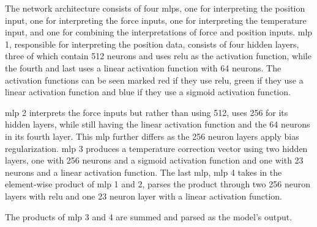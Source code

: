 The network architecture consists of four \gls{mlp}s, one for interpreting the position input, one for interpreting the force inputs, one for interpreting the temperature input, and one for combining the interpretations of force and position inputs. \gls{mlp} \num{1}, responsible for interpreting the position data, consists of four hidden layers, three of which contain \num{512} neurons and uses \gls{relu} as the activation function, while the fourth and last uses a linear activation function with \num{64} neurons. The activation functions can be seen marked red if they use \gls{relu}, green if they use a linear activation function and blue if they use a sigmoid activation function. \medskip

\gls{mlp} \num{2} interprets the force inputs but rather than using \num{512}, uses \num{256} for its hidden layers, while still having the linear activation function and the \num{64} neurons in its fourth layer. This \gls{mlp} further differs as the \num{256} neuron layers apply  bias regularization. \gls{mlp} \num{3} produces a temperature correction vector using two hidden layers, one with \num{256} neurons and a sigmoid activation function and one with \num{23} neurons and a linear activation function. The last \gls{mlp}, \gls{mlp} \num{4} takes in the element-wise product of \gls{mlp} \num{1} and \num{2}, parses the product through two \num{256} neuron layers with \gls{relu} and one \num{23} neuron layer with a linear activation function.\medskip

The products of \gls{mlp} \num{3} and \num{4} are summed and parsed as the model's output.





